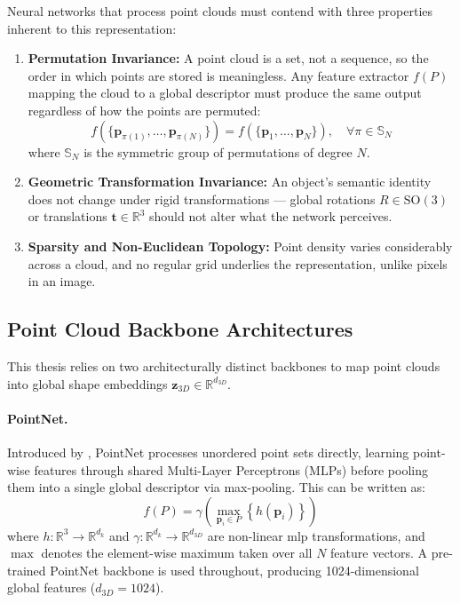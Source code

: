 Neural networks that process point clouds must contend with three properties inherent to this representation:
\begin{enumerate}
    \item \textbf{Permutation Invariance:} A point cloud is a set, not a sequence, so the order in which points are stored is meaningless. Any feature extractor $f(P)$ mapping the cloud to a global descriptor must produce the same output regardless of how the points are permuted:
    \begin{equation}
        f(\{\mathbf{p}_{\pi(1)}, \dots, \mathbf{p}_{\pi(N)}\}) = f(\{\mathbf{p}_1, \dots, \mathbf{p}_N\}), \quad \forall \pi \in \mathbb{S}_N
    \end{equation}
    where $\mathbb{S}_N$ is the symmetric group of permutations of degree $N$.
    \item \textbf{Geometric Transformation Invariance:} An object's semantic identity does not change under rigid transformations --- global rotations $R \in \mathrm{SO}(3)$ or translations $\mathbf{t} \in \mathbb{R}^3$ should not alter what the network perceives.
    \item \textbf{Sparsity and Non-Euclidean Topology:} Point density varies considerably across a cloud, and no regular grid underlies the representation, unlike pixels in an image.
\end{enumerate}

\subsection{Point Cloud Backbone Architectures}
\label{subsec:point_cloud_backbones}

This thesis relies on two architecturally distinct backbones to map point clouds into global shape embeddings $\mathbf{z}_{3D} \in \mathbb{R}^{d_{3D}}$.

\paragraph{PointNet.} Introduced by \textcite{qi2017pointnet}, PointNet processes unordered point sets directly, learning point-wise features through shared Multi-Layer Perceptrons (MLPs) before pooling them into a single global descriptor via max-pooling. This can be written as:
\begin{equation}
    f(P) = \gamma \left( \max_{\mathbf{p}_i \in P} \left\{ h(\mathbf{p}_i) \right\} \right)
\end{equation}
where $h: \mathbb{R}^3 \to \mathbb{R}^{d_k}$ and $\gamma: \mathbb{R}^{d_k} \to \mathbb{R}^{d_{3D}}$ are non-linear \gls{mlp} transformations, and $\max$ denotes the element-wise maximum taken over all $N$ feature vectors. A pre-trained PointNet backbone is used throughout, producing 1024-dimensional global features ($d_{3D} = 1024$).

